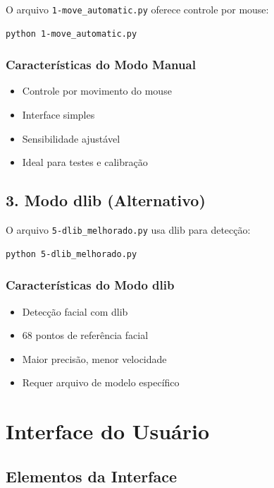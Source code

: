 \documentclass[12pt,a4paper]{article}
\begin{document}
O arquivo \texttt{1-move\_automatic.py} oferece controle por mouse:

\begin{lstlisting}[language=bash]
python 1-move_automatic.py
\end{lstlisting}

\subsubsection{Características do Modo Manual}

\begin{itemize}
    \item Controle por movimento do mouse
    \item Interface simples
    \item Sensibilidade ajustável
    \item Ideal para testes e calibração
\end{itemize}

\subsection{3. Modo dlib (Alternativo)}

O arquivo \texttt{5-dlib\_melhorado.py} usa dlib para detecção:

\begin{lstlisting}[language=bash]
python 5-dlib_melhorado.py
\end{lstlisting}

\subsubsection{Características do Modo dlib}

\begin{itemize}
    \item Detecção facial com dlib
    \item 68 pontos de referência facial
    \item Maior precisão, menor velocidade
    \item Requer arquivo de modelo específico
\end{itemize}

\section{Interface do Usuário}

\subsection{Elementos da Interface}
\end{document}

